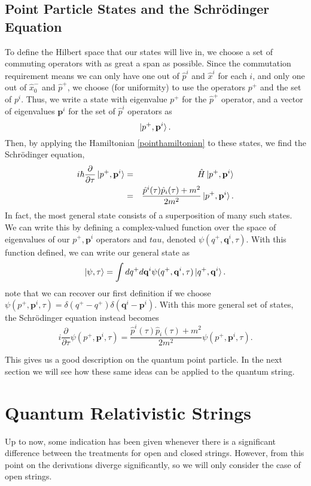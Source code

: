 \documentclass[a4paper,12pt]{article}
\numberwithin{equation}{section}
\begin{document}
\subsection{Point Particle States and the Schr\"{o}dinger Equation}
To define the Hilbert space that our states will live in, we choose a set of commuting operators with as great a span as possible. Since the commutation requirement means we can only have one out of $\hat{p}^i$ and $\hat{x}^i$ for each $i$, and only one out of $\hat{x}_0^-$ and $\hat{p}^+$, we choose (for uniformity) to use the operators $p^+$ and the set of $p^i$. Thus, we write a state with eigenvalue $p^+$ for the $\hat{p}^+$ operator, and a vector of eigenvalues $\mathbf{p}^i$ for the set of $\hat{p}^i$ operators as
\begin{equation}
\ket{p^+, \mathbf{p}^i}.
\end{equation}
Then, by applying the Hamiltonian \ref{pointhamiltonian} to these states, we find the Schr\"{o}dinger equation,
\begin{eqnarray*}
i\hbar\frac{\partial}{\partial \tau}\ket{p^+,\mathbf{p}^i} &=& \hat{H}\ket{p^+,\mathbf{p}^i}\\
&=& \frac{\hat{p}^i(\tau)\hat{p}_i(\tau) + m^2}{2m^2}\ket{p^+,\mathbf{p}^i}.
\end{eqnarray*}
In fact, the most general state consists of a superposition of many such states. We can write this by defining a complex-valued function over the space of eigenvalues of our $p^+, \mathbf{p}^i$ operators and $tau$, denoted $\psi(q^+,\mathbf{q}^i,\tau)$. With this function defined, we can write our general state as
\begin{equation}
\ket{\psi,\tau} = \int dq^+ d\mathbf{q}^i \psi(q^+,\mathbf{q}^i,\tau)\ket{q^+,\mathbf{q}^i}.
\end{equation}
note that we can recover our first definition if we choose $\psi(p^+,\mathbf{p}^i,\tau) = \delta(q^+-q^+)\delta(\mathbf{q}^i-\mathbf{p}^i)$. With this more general set of states, the Schr\"{o}dinger equation instead becomes
\begin{equation}
i\frac{\partial}{\partial \tau} \psi(p^+,\mathbf{p}^i,\tau) = \frac{\hat{p}^i(\tau)\hat{p}_i(\tau) + m^2}{2m^2}\psi(p^+,\mathbf{p}^i,\tau).
\end{equation}

This gives us a good description on the quantum point particle. In the next section we will see how these same ideas can be applied to the quantum string.
\section{Quantum Relativistic Strings}\label{qrs}
Up to now, some indication has been given whenever there is a significant difference between the treatments for open and closed strings. However, from this point on the derivations diverge significantly, so we will only consider the case of open strings. 
\end{document}
